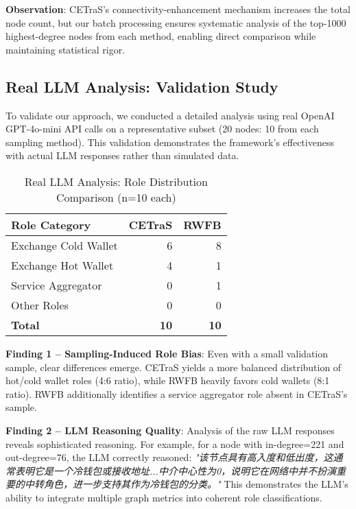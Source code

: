 \textbf{Observation}: CETraS's connectivity-enhancement mechanism increases the total node count, but our batch processing ensures systematic analysis of the top-1000 highest-degree nodes from each method, enabling direct comparison while maintaining statistical rigor.

\subsection{Real LLM Analysis: Validation Study}

To validate our approach, we conducted a detailed analysis using real OpenAI GPT-4o-mini API calls on a representative subset (20 nodes: 10 from each sampling method). This validation demonstrates the framework's effectiveness with actual LLM responses rather than simulated data.

\begin{table}[!t]
\centering
\caption{Real LLM Analysis: Role Distribution Comparison (n=10 each)}
\label{tab:real-llm-roles}
\begin{tabular}{l r r}
\toprule
Role Category & CETraS & RWFB \\
\midrule
Exchange Cold Wallet & 6 & 8 \\
Exchange Hot Wallet & 4 & 1 \\
Service Aggregator & 0 & 1 \\
Other Roles & 0 & 0 \\
\bottomrule
\textbf{Total} & \textbf{10} & \textbf{10} \\
\end{tabular}
\end{table}

\textbf{Finding 1 -- Sampling-Induced Role Bias}: Even with a small validation sample, clear differences emerge. CETraS yields a more balanced distribution of hot/cold wallet roles (4:6 ratio), while RWFB heavily favors cold wallets (8:1 ratio). RWFB additionally identifies a service aggregator role absent in CETraS's sample.

\textbf{Finding 2 -- LLM Reasoning Quality}: Analysis of the raw LLM responses reveals sophisticated reasoning. For example, for a node with in-degree=221 and out-degree=76, the LLM correctly reasoned: \textit{"该节点具有高入度和低出度，这通常表明它是一个冷钱包或接收地址...中介中心性为0，说明它在网络中并不扮演重要的中转角色，进一步支持其作为冷钱包的分类。"} This demonstrates the LLM's ability to integrate multiple graph metrics into coherent role classifications.

